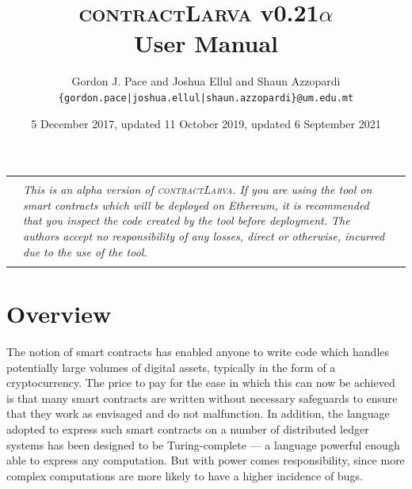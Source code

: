 \documentclass{article}
\newcommand{\contractlarva}{\textsc{contractLarva}\xspace}
\begin{document}
\title{\contractlarva v0.21$\alpha$\\User Manual}
\author{Gordon J. Pace and Joshua Ellul and Shaun Azzopardi\\\texttt{\{gordon.pace|joshua.ellul|shaun.azzopardi\}@um.edu.mt}}
\date{5 December 2017, updated 11 October 2019, updated 6 September 2021}
\maketitle


\begin{center}
  \begin{tabular}{|lll|}\hline\qquad&&\qquad\\
    &\begin{minipage}{0.8\textwidth}
      \emph{This is an alpha version of \contractlarva. If you are using the tool on smart contracts which will be deployed on Ethereum, it is recommended that you inspect the code created by the tool before deployment. The authors accept no responsibility of any losses, direct or otherwise, incurred due to the use of the tool.}
    \end{minipage}&\\&&\\
  \hline\end{tabular} 
\end{center}



  \section{Overview}
  
  The notion of smart contracts has enabled anyone to write code which handles potentially large volumes of digital assets, typically in the form of a cryptocurrency. The price to pay for the ease in which this can now be achieved is that many smart contracts are written without necessary safeguards to ensure that they work as envisaged and do not  malfunction. In addition, the language adopted to express such smart contracts on a number of distributed ledger systems has been designed to be Turing-complete --- a language powerful enough able to express any computation. But with power comes responsibility, since more complex computations are more likely to have a higher incidence of bugs. 
\end{document}
